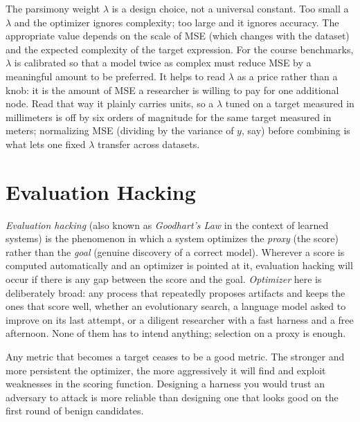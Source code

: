 \begin{remark}
The parsimony weight $\lambda$ is a design choice, not a universal constant.
Too small a $\lambda$ and the optimizer ignores complexity; too large and it ignores accuracy.
The appropriate value depends on the scale of MSE (which changes with the dataset) and the expected complexity of the target expression.
For the course benchmarks, $\lambda$ is calibrated so that a model twice as complex must reduce MSE by a meaningful amount to be preferred.
It helps to read $\lambda$ as a price rather than a knob: it is the amount of MSE a researcher is willing to pay for one additional node.
Read that way it plainly carries units, so a $\lambda$ tuned on a target measured in millimeters is off by six orders of magnitude for the same target measured in meters; normalizing MSE (dividing by the variance of $y$, say) before combining is what lets one fixed $\lambda$ transfer across datasets.
\end{remark}

\section{Evaluation Hacking}
\label{section:EvalHacking}

\emph{Evaluation hacking} (also known as \emph{Goodhart's Law} in the context of learned systems) is the phenomenon in which a system optimizes the \emph{proxy} (the score) rather than the \emph{goal} (genuine discovery of a correct model).
Wherever a score is computed automatically and an optimizer is pointed at it, evaluation hacking will occur if there is any gap between the score and the goal.
\emph{Optimizer} here is deliberately broad: any process that repeatedly proposes artifacts and keeps the ones that score well, whether an evolutionary search, a language model asked to improve on its last attempt, or a diligent researcher with a fast harness and a free afternoon.
None of them has to intend anything; selection on a proxy is enough.

\begin{principle}
\label{principle:GoodhartsLaw}
Any metric that becomes a target ceases to be a good metric.
The stronger and more persistent the optimizer, the more aggressively it will find and exploit weaknesses in the scoring function.
Designing a harness you would trust an adversary to attack is more reliable than designing one that looks good on the first round of benign candidates.
\end{principle}

